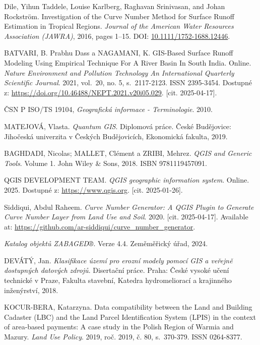 \documentclass[a4paper,oneside,12pt]{book}
\begin{document}
\begin{thebibliography}{1}
Dile, Yihun Taddele, Louise Karlberg, Raghavan Srinivasan, and Johan Rockström. 
\newblock Investigation of the Curve Number Method for Surface Runoff Estimation in Tropical Regions. 
\newblock \emph{Journal of the American Water Resources Association (JAWRA)}, 2016, pages 1--15. 
\newblock DOI: \href{https://doi.org/10.1111/1752-1688.12446}{10.1111/1752-1688.12446}.

BATVARI, B. Prabhu Dass a NAGAMANI, K. GIS-Based Surface Runoff Modeling Using Empirical Technique For A River Basin In South India. Online. \textit{Nature Environment and Pollution Technology An International Quarterly Scientific Journal}. 2021, vol.~20, no. 5, s.~2117-2123. ISSN 2395-3454. Dostupné z: \url{https://doi.org/10.46488/NEPT.2021.v20i05.029}. [cit. 2025-04-17].


ČSN P ISO/TS 19104, \textit{Geografická informace - Terminologie}. 2010.

MATEJOVÁ, Vlasta. \textit{Quantum GIS}. Diplomová práce. České Budějovice: Jihočeská univerzita v Českých Budějovicích, Ekonomická fakulta, 2019.

BAGHDADI, Nicolas; MALLET, Clément a ZRIBI, Mehrez. \textit{QGIS and Generic Tools}. Volume 1. John Wiley \& Sons, 2018. ISBN 9781119457091.

QGIS DEVELOPMENT TEAM. \textit{QGIS geographic information system}. Online. 2025. Dostupné z: \url{https://www.qgis.org}. [cit. 2025-01-26].

Siddiqui, Abdul Raheem. \textit{Curve Number Generator: A QGIS Plugin to Generate Curve Number Layer from Land Use and Soil}. 2020. [cit. 2025-04-17]. Available at: \url{https://github.com/ar-siddiqui/curve_number_generator}.

\textit{Katalog objektů ZABAGED®}. Verze 4.4. Zeměměřický úřad, 2024.


DEVÁTÝ, Jan. \textit{Klasifikace území pro erozní modely pomocí GIS a veřejně dostupných datových zdrojů}. Disertační práce. Praha: České vysoké učení technické v Praze, Fakulta stavební, Katedra hydromeliorací a krajinného inženýrství, 2018.

KOCUR-BERA, Katarzyna. Data compatibility between the Land and Building Cadaster (LBC) and the Land Parcel Identification System (LPIS) in the context of area-based payments: A case study in the Polish Region of Warmia and Mazury. \textit{Land Use Policy}. 2019, roč. 2019, č. 80, s.~370-379. ISSN 0264-8377.


\end{thebibliography}
\end{document}
